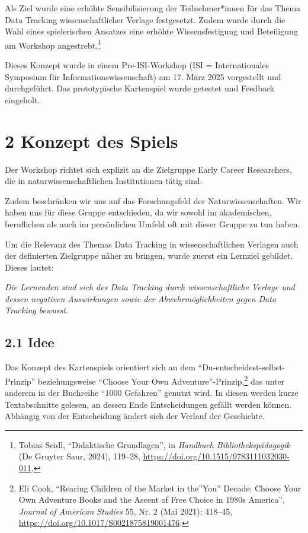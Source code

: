 \documentclass[a4paper,
fontsize=11pt,
oneside,
numbers=noperiodatend,
parskip=half-,
bibliography=totoc,
final
]{scrartcl}
\begin{document}
Als Ziel wurde eine erhöhte Sensibilisierung der Teilnehmer*innen für
das Thema Data Tracking wissenschaftlicher Verlage festgesetzt. Zudem
wurde durch die Wahl eines spielerischen Ansatzes eine erhöhte
Wissensfestigung und Beteiligung am Workshop angestrebt.\footnote{Tobias
  Seidl, \enquote{Didaktische Grundlagen}, in \emph{Handbuch
  Bibliothekspädagogik} (De Gruyter Saur, 2024), 119--28,
  \url{https://doi.org/10.1515/9783111032030-011}.}

Dieses Konzept wurde in einem Pre-ISI-Workshop (ISI = Internationales
Symposium für Informationswissenschaft) am 17. März 2025 vorgestellt und
durchgeführt. Das prototypische Kartenspiel wurde getestet und Feedback
eingeholt.

\section{2 Konzept des Spiels}\label{konzept-des-spiels}

Der Workshop richtet sich explizit an die Zielgruppe Early Career
Researchers, die in naturwissenschaftlichen Institutionen tätig sind.

Zudem beschränken wir uns auf das Forschungsfeld der
Naturwissenschaften. Wir haben uns für diese Gruppe entschieden, da wir
sowohl im akademischen, beruflichen als auch im persönlichen Umfeld oft
mit dieser Gruppe zu tun haben.

Um die Relevanz des Themas Data Tracking in wissenschaftlichen Verlagen
auch der definierten Zielgruppe näher zu bringen, wurde zuerst ein
Lernziel gebildet. Dieses lautet:

\begin{displayquote}
\emph{Die Lernenden sind sich des Data Tracking durch wissenschaftliche
Verlage und dessen negativen Auswirkungen sowie der Abwehrmöglichkeiten
gegen Data Tracking bewusst.}
\end{displayquote}

\subsection{2.1 Idee}\label{idee}

Das Konzept des Kartenspiels orientiert sich an dem
\enquote{Du-entscheidest-selbst-Prinzip} beziehungsweise \enquote{Choose
Your Own Adventure}-Prinzip,\footnote{Eli Cook, \enquote{Rearing
  Children of the Market in the}You'' Decade: Choose Your Own Adventure
  Books and the Ascent of Free Choice in 1980s America'', \emph{Journal
  of American Studies} 55, Nr. 2 (Mai 2021): 418--45,
  \url{https://doi.org/10.1017/S0021875819001476}.} das unter anderem in
der Buchreihe \enquote{1000 Gefahren} genutzt wird. In diesen werden
kurze Textabschnitte gelesen, an dessen Ende Entscheidungen gefällt
werden können. Abhängig von der Entscheidung ändert sich der Verlauf der
Geschichte.
\end{document}
